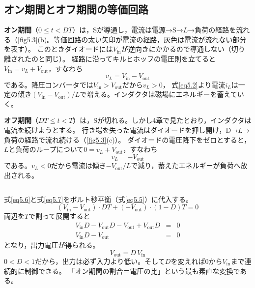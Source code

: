 \subsection{オン期間とオフ期間の等価回路}

\textbf{オン期間}（$0 \le t < DT$）は，Sが導通し，電流は電源→S→$L$→負荷の経路を流れる（\ref{fig5.3}(b)。等価回路の太い矢印が電流の経路，灰色は電流が流れない部分を表す）。
このときダイオードには$V_{\mathrm{in}}$が逆向きにかかるので導通しない（切り離されたのと同じ）。
経路に沿ってキルヒホッフの電圧則を立てると$V_{\mathrm{in}} = v_L + V_{\mathrm{out}}$，すなわち
\begin{equation}
v_L = V_{\mathrm{in}} - V_{\mathrm{out}}
\label{eq5.6}
\end{equation}
である。降圧コンバータでは$V_{\mathrm{in}} > V_{\mathrm{out}}$だから$v_L > 0$，
式\ref{eq5.2}より電流$i_L$は一定の傾き$(V_{\mathrm{in}}-V_{\mathrm{out}})/L$で増える。インダクタは磁場にエネルギーを蓄えていく。

\textbf{オフ期間}（$DT \le t < T$）は，Sが切れる。しかし4章で見たとおり，インダクタは電流を続けようとする。
行き場を失った電流はダイオードを押し開け，$\mathrm{D}$→$L$→負荷の経路で流れ続ける（\ref{fig5.3}(c)）。
ダイオードの電圧降下をゼロとすると，$L$と負荷のループについて$0 = v_L + V_{\mathrm{out}}$，すなわち
\begin{equation}
v_L = -V_{\mathrm{out}}
\label{eq5.7}
\end{equation}
である。$v_L < 0$だから電流は傾き$-V_{\mathrm{out}}/L$で減り，蓄えたエネルギーが負荷へ放出される。

\subsection{}

式\ref{eq5.6}と式\ref{eq5.7}をボルト秒平衡（式\ref{eq5.5}）に代入する。
\begin{equation}
(V_{\mathrm{in}} - V_{\mathrm{out}}) \cdot DT+ (-V_{\mathrm{out}}) \cdot (1-D)T = 0
\label{eq5.8}
\end{equation}
両辺を$T$で割って展開すると
\begin{eqnarray}
V_{\mathrm{in}} D - V_{\mathrm{out}} D - V_{\mathrm{out}} + V_{\mathrm{out}} D &=& 0 \nonumber\\
V_{\mathrm{in}} D - V_{\mathrm{out}} &=& 0 \nonumber
\end{eqnarray}
となり，出力電圧が得られる。
\begin{equation}
V_{\mathrm{out}} = D\, V_{\mathrm{in}}
\label{eq5.9}
\end{equation}
$0 < D < 1$だから，出力は必ず入力より低い。そして$D$を変えれば$0$から$V_{\mathrm{in}}$まで連続的に制御できる。
「オン期間の割合＝電圧の比」という最も素直な変換である。

